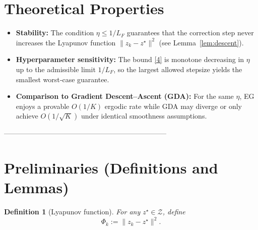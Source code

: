 \documentclass{article}
\newtheorem{definition}{Definition}
\begin{document}
\section*{Theoretical Properties}
\begin{itemize}
\item \textbf{Stability:} The condition $\eta\le1/L_F$ guarantees that the correction step never increases the Lyapunov function $\|z_k-z^\star\|^2$ (see Lemma~\ref{lem:descent}).
\item \textbf{Hyperparameter sensitivity:} The bound \eqref{4} is monotone decreasing in $\eta$ up to the admissible limit $1/L_F$, so the largest allowed stepsize yields the smallest worst‑case guarantee.
\item \textbf{Comparison to Gradient Descent–Ascent (GDA):} For the same $\eta$, EG enjoys a provable $O(1/K)$ ergodic rate while GDA may diverge or only achieve $O(1/\sqrt{K})$ under identical smoothness assumptions.
\end{itemize}

---------------------------------------------------------------------

\section*{Preliminaries (Definitions and Lemmas)}
\begin{definition}[Lyapunov function]
For any $z^\star\in\mathcal Z$, define  
\[
\Phi_k:=\|z_k-z^\star\|^{2}.
\]
\end{definition}
\end{document}
